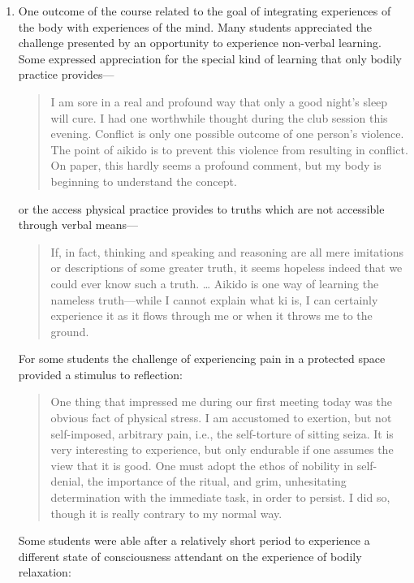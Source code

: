 \begin{enumerate}
\item One outcome of the course related to the goal of integrating experiences of the body with experiences of the mind. Many students appreciated the challenge presented by an opportunity to experience non-verbal learning. Some expressed appreciation for the special kind of learning that only bodily practice provides---
\begin{quote}
I am sore in a real and profound way that only a good night's sleep will cure. I had one worthwhile thought during the club session this evening. Conflict is only one possible outcome of one person's violence. The point of aikido is to prevent this violence from resulting in conflict. On paper, this hardly seems a profound comment, but my body is beginning to understand the concept.
\end{quote}
or the access physical practice provides to truths which are not accessible through verbal means---
\begin{quote}
If, in fact, thinking and speaking and reasoning are all mere imitations or descriptions of some greater truth, it seems hopeless indeed that we could ever know such a truth. \ldots{} Aikido is one way of learning the nameless truth---while I cannot explain what ki is, I can certainly experience it as it flows through me or when it throws me to the ground.
\end{quote}
For some students the challenge of experiencing pain in a protected space provided a stimulus to reflection:
\begin{quote}
One thing that impressed me during our first meeting today was the obvious fact of physical stress. I am accustomed to exertion, but not self-imposed, arbitrary pain, i.e., the self-torture of sitting seiza. It is very interesting to experience, but only endurable if one assumes the view that it is good. One must adopt the ethos of nobility in self-denial, the importance of the ritual, and grim, unhesitating determination with the immediate task, in order to persist. I did so, though it is really contrary to my normal way. 
\end{quote}
Some students were able after a relatively short period to experience a different state of consciousness attendant on the experience of bodily relaxation:
\begin{quote}

\end{quote}
\end{enumerate}
